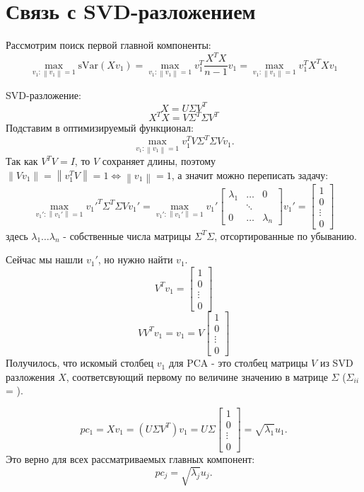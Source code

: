 \documentclass[12pt]{article} %
\theoremstyle{definition} %
\begin{document}
\section{Связь с SVD-разложением}
Рассмотрим поиск первой главной компоненты:
$$\max_{v_1: \left\| v_1 \right\| = 1} \text{sVar}(Xv_1)
= \max_{v_1: \left\| v_1 \right\| = 1} v_1^T \frac{X^TX}{n-1} v_1 =
\max_{v_1: \left\| v_1 \right\| = 1} v_1^T X^TX v_1 $$

SVD-разложение:
$$X = U\Sigma V^T$$
$$X^TX = V \Sigma^T \Sigma V^T$$
Подставим в оптимизируемый функционал:
$$ \max_{v_1: \left\| v_1 \right\| = 1} v_1^T V \Sigma^T \Sigma V v_1.$$
Так как $V^TV=I$, то $V$ сохраняет длины, поэтому
$\left\| Vv_1 \right\| = \left\| v_1^T V \right\| = 1 \iff \left\| v_1 \right\|=1$, а значит можно переписать задачу:
$$ \max_{v_1': \left\| v_1' \right\| = 1} v_1'^T \Sigma^T \Sigma V v_1'
=
\max_{v_1': \left\| v_1' \right\| = 1}
v_1'
\begin{bmatrix}
\lambda_1 & \dots & 0\\
& \ddots &\\
0 & \dots & \lambda_n
\end{bmatrix} v_1' = 
\begin{bmatrix}
1\\
0\\
\vdots\\
0
\end{bmatrix}$$
здесь $\lambda_1 \dots \lambda_n$ - собственные числа матрицы $\Sigma^T\Sigma$,
отсортированные по убыванию. 

Сейчас мы нашли $v_1'$, но нужно найти $v_1$.
$$V^Tv_1 = 
\begin{bmatrix}
1\\
0\\
\vdots\\
0
\end{bmatrix}$$
$$VV^Tv_1 = v_1 = V
\begin{bmatrix}
1\\
0\\
\vdots\\
0
\end{bmatrix}$$
Получилось, что искомый столбец $v_1$ для PCA - это столбец матрицы $V$ из SVD разложения $X$, соответсвующий первому по величине значению в матрице $\Sigma$ ($\Sigma_{ii}$ = ).

$$pc_1 = Xv_1 = (U\Sigma V^T)v_1 = 
U \Sigma
\begin{bmatrix}
1\\
0\\
\vdots\\
0
\end{bmatrix}=
\sqrt{\lambda_1}u_1.
$$
Это верно для всех рассматриваемых главных компонент:
$$pc_j = \sqrt{\lambda_j} u_j.$$
\end{document}
